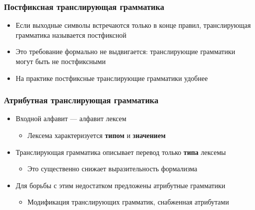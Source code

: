 \documentclass{beamer}
\begin{document}
\begin{frame}[fragile]
  \transwipe[direction=90]
  \frametitle{Постфиксная транслирующая грамматика}
  \begin{itemize}
    \item Если выходные символы встречаются только в конце правил, транслирующая грамматика называется постфиксной
    \item Это требование формально не выдвигается: транслирующие грамматики могут быть не постфиксными
    \item На практике постфиксные транслирующие грамматики удобнее
  \end{itemize}
\end{frame}

\begin{frame}[fragile]
  \transwipe[direction=90]
  \frametitle{Атрибутная транслирующая грамматика}
  \begin{itemize}
    \item Входной алфавит --- алфавит лексем
    \begin{itemize}
      \item Лексема характеризуется \textbf{типом} и \textbf{значением}
    \end{itemize}
    \item Транслирующая грамматика описывает перевод только \textbf{типа} лексемы
    \begin{itemize}
      \item Это существенно снижает выразительность формализма
    \end{itemize}
    \item Для борьбы с этим недостатком предложены атрибутные грамматики
    \begin{itemize}
      \item Модификация транслирующих грамматик, снабженная атрибутами
    \end{itemize}
  \end{itemize}
\end{frame}
\end{document}
